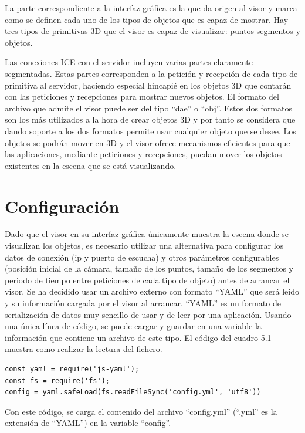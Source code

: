 La parte correspondiente a la interfaz gráfica es la que da origen al visor y marca como se definen cada uno de los tipos de objetos que es capaz de mostrar. Hay tres tipos de primitivas 3D que el visor es capaz de visualizar: puntos segmentos y objetos.

Las conexiones ICE con el servidor incluyen varias partes claramente segmentadas. Estas partes corresponden a la petición y recepción de cada tipo de primitiva al servidor, haciendo especial hincapié en los objetos 3D que contarán con las peticiones y recepciones para mostrar nuevos objetos. El formato del archivo que admite el visor puede ser del tipo ``dae'' o ``obj''. Estos dos formatos son los más utilizados a la hora de crear objetos 3D y por tanto se considera que dando soporte a los dos formatos permite usar cualquier objeto que se desee. Los objetos se podrán mover en 3D y el visor ofrece mecanismos eficientes para que las aplicaciones, mediante  peticiones y recepciones, puedan mover los objetos existentes en la escena que se está visualizando.

\section{Configuración}
Dado que el visor en su interfaz gráfica únicamente muestra la escena donde se visualizan los objetos, es necesario utilizar una alternativa para configurar los datos de conexión (ip y puerto de escucha) y otros parámetros configurables (posición inicial de la cámara, tamaño de los puntos, tamaño de los segmentos y periodo de tiempo entre peticiones de cada tipo de objeto) antes de arrancar el visor.
Se ha decidido usar un archivo externo con formato ``YAML'' que será leído y su información cargada por el visor al arrancar. ``YAML'' es un formato de serialización de datos muy sencillo de usar y de leer por una aplicación. Usando una única línea de código, se puede cargar y guardar en una variable la información que contiene un archivo de este tipo. El código del cuadro 5.1 muestra como realizar la lectura del fichero.
\begin{lstlisting}[caption = Leer el fichero ``YAML'' con la configuración y guardar la información en una variable, label = cod.yaml]
const yaml = require('js-yaml');
const fs = require('fs');
config = yaml.safeLoad(fs.readFileSync('config.yml', 'utf8'))
\end{lstlisting}
Con este código, se carga el contenido del archivo ``config.yml'' (``.yml'' es la extensión de ``YAML'') en la variable ``config''.

